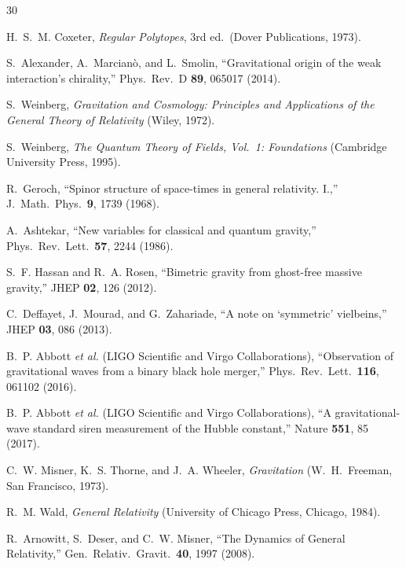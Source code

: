 \documentclass[aps,prd,preprint,superscriptaddress,showpacs,preprintnumbers,amsmath,amssymb,nofootinbib]{revtex4-2}
\begin{document}
\begin{thebibliography}{30}

H.~S.~M. Coxeter, \emph{Regular Polytopes}, 3rd ed.\ (Dover Publications, 1973).

S.~Alexander, A.~Marcian\`o, and L.~Smolin, ``Gravitational origin of the weak interaction's chirality,'' Phys.\ Rev.\ D \textbf{89}, 065017 (2014).

S.~Weinberg, \emph{Gravitation and Cosmology: Principles and Applications of the General Theory of Relativity} (Wiley, 1972).

S.~Weinberg, \emph{The Quantum Theory of Fields, Vol.\ 1: Foundations} (Cambridge University Press, 1995).

R.~Geroch, ``Spinor structure of space-times in general relativity. I.,'' J.\ Math.\ Phys.\ \textbf{9}, 1739 (1968).

A.~Ashtekar, ``New variables for classical and quantum gravity,'' Phys.\ Rev.\ Lett.\ \textbf{57}, 2244 (1986).

S.~F. Hassan and R.~A. Rosen, ``Bimetric gravity from ghost-free massive gravity,'' JHEP \textbf{02}, 126 (2012).

C.~Deffayet, J.~Mourad, and G.~Zahariade, ``A note on `symmetric' vielbeins,'' JHEP \textbf{03}, 086 (2013).

B.~P. Abbott \textit{et al.} (LIGO Scientific and Virgo Collaborations), ``Observation of gravitational waves from a binary black hole merger,'' Phys.\ Rev.\ Lett.\ \textbf{116}, 061102 (2016).

B.~P. Abbott \textit{et al.} (LIGO Scientific and Virgo Collaborations), ``A gravitational-wave standard siren measurement of the Hubble constant,'' Nature \textbf{551}, 85 (2017).

C.~W. Misner, K.~S. Thorne, and J.~A. Wheeler, \emph{Gravitation} (W.~H.~Freeman, San Francisco, 1973).

R.~M. Wald, \emph{General Relativity} (University of Chicago Press, Chicago, 1984).

R.~Arnowitt, S.~Deser, and C.~W. Misner, ``The Dynamics of General Relativity,'' Gen.\ Relativ.\ Gravit.\ \textbf{40}, 1997 (2008).


\end{thebibliography}
\end{document}
